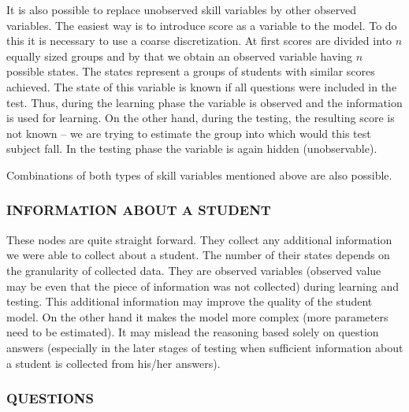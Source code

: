 \label{observed_score}
It is also possible to replace unobserved skill variables by other observed variables. The easiest way is to introduce score as a variable to the model. To do this it is necessary to use a coarse discretization. At first scores are divided into $n$ equally sized groups and by that we obtain an observed variable having $n$ possible states. The states represent a groups of students with similar scores achieved. The state of this variable is known if all questions were included in the test. Thus, during the learning phase the variable is observed and the information is used for learning. On the other hand, during the testing, the resulting score is not known -- we are trying to estimate the group into which would this test subject fall. In the testing phase the variable is again hidden (unobservable).

Combinations of both types of skill variables mentioned above are also possible.

\subsubsection{INFORMATION ABOUT A STUDENT}
These nodes are quite straight forward. They collect any additional information we were able to collect about a student. The number of their states depends on the granularity of collected data. They are observed variables (observed value may be even that the piece of information was not collected) during learning and testing.
This additional information may improve the quality of the student model. On the other hand it makes the model more complex (more parameters need to be estimated). It may mislead the reasoning based solely on question answers (especially in the later stages of testing when sufficient information about a student is collected from his/her answers). 


\subsubsection{QUESTIONS}

